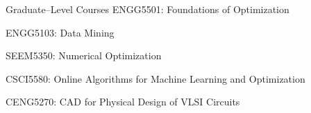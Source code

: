 \begin{rSection}{Graduate--Level Courses}
    ENGG5501: Foundations of Optimization

    ENGG5103: Data Mining 

    SEEM5350: Numerical Optimization 

    CSCI5580: Online Algorithms for Machine Learning and Optimization 

    CENG5270: CAD for Physical Design of VLSI Circuits
\end{rSection}

